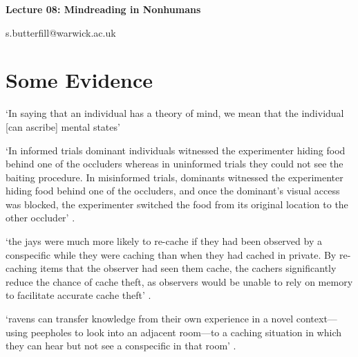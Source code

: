\documentclass[12pt]{extarticle}
\date{}
\makeatletter
\def \ititle {Origins of Mind}
\def \iemail{s.butterfill@warwick.ac.uk}
\makeatother
\begin{document}
\begin{multicols*}{3}

\setlength\footnotesep{1em}












\def \ititle {Lecture 08: Mindreading in Nonhumans}

\begin{center}

{\Large

\textbf{\ititle}

}



\iemail %

\end{center}



\section{Some Evidence}

‘In saying that an individual has a theory of mind, we mean that the individual [can ascribe] mental states’
\citep[p.\ 515]{premack_does_1978}

‘In informed trials dominant individuals witnessed the experimenter hiding
food behind one of the occluders whereas in uninformed trials they could
not see the baiting procedure. In misinformed trials, dominants witnessed
the experimenter hiding food behind one of the occluders, and once the
dominant’s visual access was blocked, the experimenter switched the food
from its original location to the other occluder’ \citep{Hare:2001ph}.

‘the jays were much more likely to re-cache if they had been observed by a conspecific while they
were caching than when they had cached in private. By re-caching items that the observer had seen
them cache, the cachers significantly reduce the chance of cache theft, as observers would be unable
to rely on memory to facilitate accurate cache theft’ \citep[p.~516]{Clayton:2007fh}.

‘ravens can transfer knowledge from their own experience in a novel context---using peepholes to look
into an adjacent room---to a caching situation in which they can hear but not see a conspecific in that
room’ \citep{bugnyar:2016_ravens}.




\end{multicols*}
\end{document}
